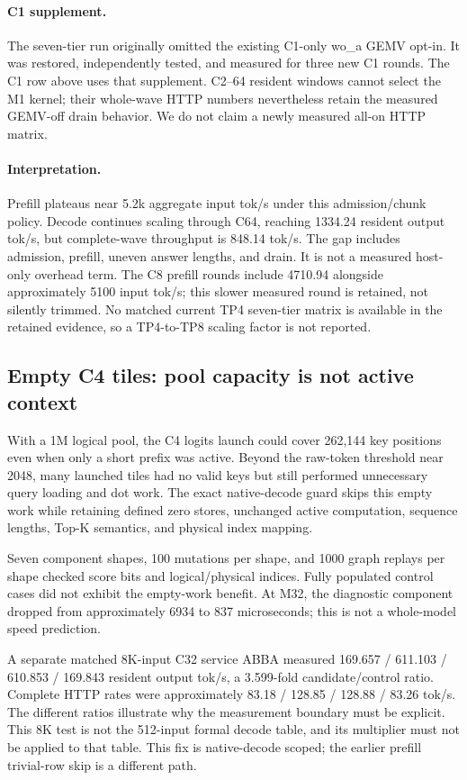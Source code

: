 \paragraph{C1 supplement.}
The seven-tier run originally omitted the existing C1-only wo\_a GEMV opt-in.
It was restored, independently tested, and measured for three new C1 rounds.
The C1 row above uses that supplement. C2--64 resident windows cannot select
the M1 kernel; their whole-wave HTTP numbers nevertheless retain the measured
GEMV-off drain behavior. We do not claim a newly measured all-on HTTP matrix.

\paragraph{Interpretation.}
Prefill plateaus near 5.2k aggregate input tok/s under this admission/chunk
policy. Decode continues scaling through C64, reaching 1334.24 resident output
tok/s, but complete-wave throughput is 848.14 tok/s. The gap includes admission,
prefill, uneven answer lengths, and drain. It is not a measured host-only
overhead term. The C8 prefill rounds include 4710.94 alongside approximately
5100 input tok/s; this slower measured round is retained, not silently trimmed.
No matched current TP4 seven-tier matrix is available in the retained evidence,
so a TP4-to-TP8 scaling factor is not reported.

\subsection{Empty C4 tiles: pool capacity is not active context}

With a 1M logical pool, the C4 logits launch could cover 262,144 key positions
even when only a short prefix was active. Beyond the raw-token threshold near
2048, many launched tiles had no valid keys but still performed unnecessary
query loading and dot work. The exact native-decode guard skips this empty
work while retaining defined zero stores, unchanged active computation,
sequence lengths, Top-K semantics, and physical index mapping.

Seven component shapes, 100 mutations per shape, and 1000 graph replays per
shape checked score bits and logical/physical indices. Fully populated control
cases did not exhibit the empty-work benefit. At M32, the diagnostic component
dropped from approximately 6934 to 837 microseconds; this is not a whole-model
speed prediction.

A separate matched 8K-input C32 service ABBA measured
169.657 / 611.103 / 610.853 / 169.843 resident output tok/s, a 3.599-fold
candidate/control ratio. Complete HTTP rates were approximately 83.18 / 128.85 /
128.88 / 83.26 tok/s. The different ratios illustrate why the measurement
boundary must be explicit. This 8K test is not the 512-input formal decode
table, and its multiplier must not be applied to that table. This fix is
native-decode scoped; the earlier prefill trivial-row skip is a different path.

